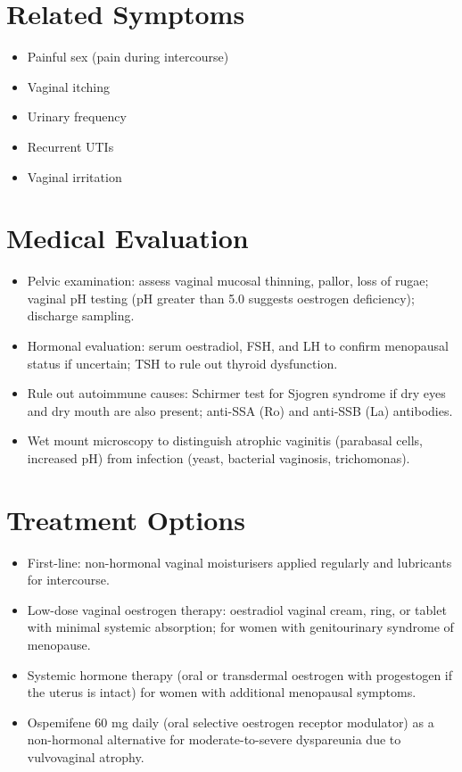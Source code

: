 \section*{Related Symptoms}
\begin{itemize}
  \item Painful sex (pain during intercourse)
  \item Vaginal itching
  \item Urinary frequency
  \item Recurrent UTIs
  \item Vaginal irritation
\end{itemize}

\section*{Medical Evaluation}
\begin{itemize}
  \item Pelvic examination: assess vaginal mucosal thinning, pallor, loss of rugae; vaginal pH testing (pH greater than 5.0 suggests oestrogen deficiency); discharge sampling.
  \item Hormonal evaluation: serum oestradiol, FSH, and LH to confirm menopausal status if uncertain; TSH to rule out thyroid dysfunction.
  \item Rule out autoimmune causes: Schirmer test for Sjogren syndrome if dry eyes and dry mouth are also present; anti-SSA (Ro) and anti-SSB (La) antibodies.
  \item Wet mount microscopy to distinguish atrophic vaginitis (parabasal cells, increased pH) from infection (yeast, bacterial vaginosis, trichomonas).
\end{itemize}

\section*{Treatment Options}
\begin{itemize}
  \item First-line: non-hormonal vaginal moisturisers applied regularly and lubricants for intercourse.
  \item Low-dose vaginal oestrogen therapy: oestradiol vaginal cream, ring, or tablet with minimal systemic absorption; for women with genitourinary syndrome of menopause.
  \item Systemic hormone therapy (oral or transdermal oestrogen with progestogen if the uterus is intact) for women with additional menopausal symptoms.
  \item Ospemifene 60 mg daily (oral selective oestrogen receptor modulator) as a non-hormonal alternative for moderate-to-severe dyspareunia due to vulvovaginal atrophy.
\end{itemize}

